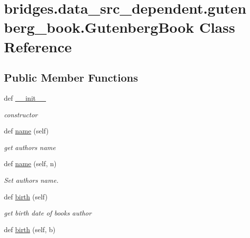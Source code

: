 \hypertarget{classbridges_1_1data__src__dependent_1_1gutenberg__book_1_1_gutenberg_book}{}\section{bridges.\+data\+\_\+src\+\_\+dependent.\+gutenberg\+\_\+book.\+Gutenberg\+Book Class Reference}
\label{classbridges_1_1data__src__dependent_1_1gutenberg__book_1_1_gutenberg_book}
\subsection*{Public Member Functions}
\begin{DoxyCompactItemize}
\item 
def \hyperlink{classbridges_1_1data__src__dependent_1_1gutenberg__book_1_1_gutenberg_book_ac44f922d6f63fc6ab3c0788ea9b9c4b5}{\+\_\+\+\_\+init\+\_\+\+\_\+}
\begin{DoxyCompactList}\small\item\em constructor \end{DoxyCompactList}\item 
def \hyperlink{classbridges_1_1data__src__dependent_1_1gutenberg__book_1_1_gutenberg_book_a8b7e11a07b7227b7798e6c461f0e3e88}{name} (self)
\begin{DoxyCompactList}\small\item\em get author\textquotesingle{}s name \end{DoxyCompactList}\item 
def \hyperlink{classbridges_1_1data__src__dependent_1_1gutenberg__book_1_1_gutenberg_book_aa3aefe0ebdc4d09c1011399b52808e62}{name} (self, n)
\begin{DoxyCompactList}\small\item\em Set author\textquotesingle{}s name. \end{DoxyCompactList}\item 
def \hyperlink{classbridges_1_1data__src__dependent_1_1gutenberg__book_1_1_gutenberg_book_a4f3d3453a3cd9702174d74c916018fbd}{birth} (self)
\begin{DoxyCompactList}\small\item\em get birth date of book\textquotesingle{}s author \end{DoxyCompactList}\item 
def \hyperlink{classbridges_1_1data__src__dependent_1_1gutenberg__book_1_1_gutenberg_book_a228d27a028d1abff133807d372da5b82}{birth} (self, b)

\end{DoxyCompactItemize}
